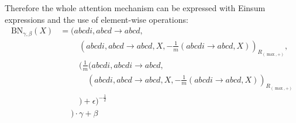 Therefore the whole attention mechanism can be expressed with Einsum expressions and the use of element-wise operations:
\begin{align*}
    \text{BN}_{\gamma,\beta}(X) & = (abcdi, abcd \rightarrow abcd,                                                                                   \\
                                & \phantom{{}=\quad}(abcdi, abcd \rightarrow abcd, X,-\frac{1}{m} (abcdi \rightarrow abcd, X))_{R_{(\max,+)}},       \\
                                & \phantom{{}=\quad} (\frac{1}{m} (abcdi,abcdi \rightarrow abcd,                                                     \\
                                & \phantom{{}=\quad\quad} (abcdi, abcd \rightarrow abcd, X, -\frac{1}{m} (abcdi \rightarrow abcd, X))_{R_{(\max,+)}} \\
                                & \phantom{{}=\quad}) + \epsilon)^{-\frac{1}{2}}                                                                     \\
                                & \phantom{{}=}) \cdot \gamma + \beta
\end{align*}
